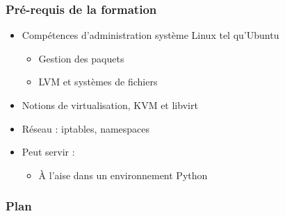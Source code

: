   \begin{frame}
    \frametitle{Pré-requis de la formation}
    \begin{itemize}
      \item Compétences d'administration système Linux tel qu'Ubuntu
      \begin{itemize}
        \item Gestion des paquets
        \item LVM et systèmes de fichiers
      \end{itemize}
      \item Notions de virtualisation, KVM et libvirt
      \item Réseau : iptables, namespaces
      \item Peut servir :
      \begin{itemize}
        \item À l'aise dans un environnement Python
      \end{itemize}
    \end{itemize}
  \end{frame}

  \begin{frame}
    \frametitle{Plan}
    \tableofcontents[hideallsubsections]
  \end{frame}
